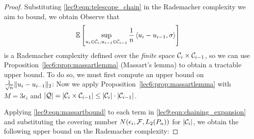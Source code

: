 \begin{proof}
    Substituting \eqref{lec9:eqn:telescope_chain} in the Rademacher complexity we aim to bound, we obtain
    Observe that
    \begin{equation}
        \operatorname*{\mathbb{E}}\left[ \sup_{u_i \in \mathcal C_i, u_{i - 1} \in \mathcal C_{i - 1}} \frac 1 n\left\langle u_i-u_{i - 1}, \sigma\right\rangle\right]
    \end{equation}
    is a Rademacher complexity defined over the \emph{finite} space $\mathcal C_i \times \mathcal C_{i - 1}$, so we can use Proposition~\ref{lec6:prop:massartlemma} (Massart's lemma) to obtain a tractable upper bound. To do so, we must first compute an upper bound on $\frac{1}{\sqrt{n}} \|u_i - u_{i - 1}\|_2$:
    Now we apply Proposition~\ref{lec6:prop:massartlemma} with $M = 3 \epsilon_i$ and $\left\lvert\mathcal Q\right\rvert = \left\lvert\mathcal C_i \times \mathcal C_{i - 1}\right\rvert \leq \left\lvert\mathcal C_i\right\rvert \cdot \left\lvert\mathcal C_{i - 1}\right\rvert$.
    
    Applying \eqref{lec9:eqn:massartbound} to each term in \eqref{lec9:eqn:chaining_expansion} and substituting the covering number $N(\epsilon_i, \mathcal F, L_2(P_n))$ for $|\mathcal C_i|$, we obtain the following upper bound on the Rademacher complexity:


\end{proof}
